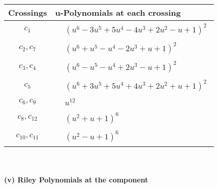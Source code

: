 \documentclass[1p]{elsarticle_modified}
\theoremstyle{definition}
\begin{document}
\begin{tabular}{m{50pt}|m{274pt}}
Crossings & \hspace{64pt}u-Polynomials at each crossing \\
\hline $$\begin{aligned}c_{1}\end{aligned}$$&$\begin{aligned}
&(u^6-3 u^5+5 u^4-4 u^3+2 u^2- u+1)^2
\end{aligned}$\\
\hline $$\begin{aligned}c_{2},c_{7}\end{aligned}$$&$\begin{aligned}
&(u^6+u^5- u^4-2 u^3+u+1)^2
\end{aligned}$\\
\hline $$\begin{aligned}c_{3},c_{4}\end{aligned}$$&$\begin{aligned}
&(u^6- u^5- u^4+2 u^3- u+1)^2
\end{aligned}$\\
\hline $$\begin{aligned}c_{5}\end{aligned}$$&$\begin{aligned}
&(u^6+3 u^5+5 u^4+4 u^3+2 u^2+u+1)^2
\end{aligned}$\\
\hline $$\begin{aligned}c_{6},c_{9}\end{aligned}$$&$\begin{aligned}
&u^{12}
\end{aligned}$\\
\hline $$\begin{aligned}c_{8},c_{12}\end{aligned}$$&$\begin{aligned}
&(u^2+u+1)^6
\end{aligned}$\\
\hline $$\begin{aligned}c_{10},c_{11}\end{aligned}$$&$\begin{aligned}
&(u^2- u+1)^6
\end{aligned}$\\
\hline
\end{tabular}\\~\\
\newpage\renewcommand{\arraystretch}{1}
\flushleft \textbf{(v) Riley Polynomials at the component}\newline \\
\end{document}
